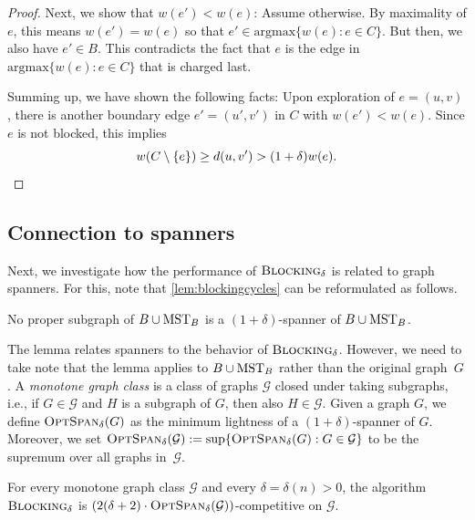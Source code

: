 \documentclass[a4paper,cleveref, autoref, thm-restate, thm-restate, UKenglish]{lipics-v2021}
\newcommand{\argmax}{\text{argmax}}
\newcommand{\blocking}{\textsc{Blocking}}
\newcommand{\optspan}{\textsc{OptSpan}_\delta}
\begin{document}
\begin{proof}
Next, we show that $w(e')<w(e)$: Assume otherwise. By maximality of $e$, this means $w(e')=w(e)$ so that $e' \in \argmax \{w(e)\colon e \in C \}$. But then, we also have $e' \in B$. This contradicts the fact that $e$ is the edge in $\argmax \{w(e)\colon e \in C \}$ that is charged last.

Summing up, we have shown the following facts: Upon exploration of $e=(u,v)$, there is another boundary edge $e'=(u',v')$ in $C$ with $w(e')<w(e)$. Since $e$ is not blocked, this implies 
\begin{equation*}
w(C \setminus \{e\}) \geq d(u,v') > (1 +\delta) w(e).  \qedhere
\end{equation*}
\end{proof}

\subsection{Connection to spanners}\label{sec:connectionspanner}

Next, we investigate how the performance of $\blocking_\delta$ is related to graph spanners. 
For this, note that \cref{lem:blockingcycles} can be reformulated as follows.

\begin{lemma}\label{lem:blockingspanner}
No proper subgraph of $B \cup \mathrm{MST}_B$ is a $(1+\delta)$-spanner of $B \cup \mathrm{MST}_B$.
\end{lemma}

The lemma relates spanners to the behavior of $\blocking_\delta$.
However, we need to take note that the lemma applies to $B \cup \mathrm{MST}_B$ rather than the original graph~$G$.
A \emph{monotone graph class} is a class of graphs $\mathcal{G}$ closed under taking subgraphs, i.e., if $G \in \mathcal{G}$ and $H$ is a subgraph of $G$, then also $H \in \mathcal{G}$. Given a graph $G$, we define $\optspan (G)$ as the minimum lightness of a $(1+\delta)$-spanner of $G$. Moreover, we set  
$\optspan ( \mathcal{G}):=\sup \{\optspan (G) : G \in \mathcal{G} \}$ to be the supremum over all graphs in~$\mathcal{G}$.

\begin{theorem}\label{mainthm}
For every  monotone graph class $\mathcal{G}$ and every $\delta=\delta(n)>0$, the algorithm $\blocking_\delta$ is $\left( 2(\delta+2)\cdot \optspan (\mathcal{G}) \right)$-competitive on $\mathcal{G}$.
\end{theorem}
\end{document}
